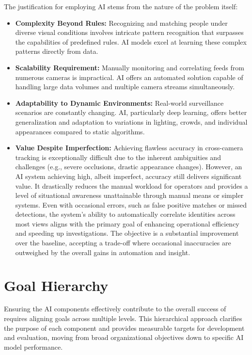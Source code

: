 The justification for employing AI stems from the nature of the problem itself:
\begin{itemize}
    \item \textbf{Complexity Beyond Rules:} Recognizing and matching people under diverse visual conditions involves intricate pattern recognition that surpasses the capabilities of predefined rules. AI models excel at learning these complex patterns directly from data.
    \item \textbf{Scalability Requirement:} Manually monitoring and correlating feeds from numerous cameras is impractical. AI offers an automated solution capable of handling large data volumes and multiple camera streams simultaneously.
    \item \textbf{Adaptability to Dynamic Environments:} Real-world surveillance scenarios are constantly changing. AI, particularly deep learning, offers better generalization and adaptation to variations in lighting, crowds, and individual appearances compared to static algorithms.
    \item \textbf{Value Despite Imperfection:} Achieving flawless accuracy in cross-camera tracking is exceptionally difficult due to the inherent ambiguities and challenges (e.g., severe occlusions, drastic appearance changes). However, an AI system achieving high, albeit imperfect, accuracy still delivers significant value. It drastically reduces the manual workload for operators and provides a level of situational awareness unattainable through manual means or simpler systems. Even with occasional errors, such as false positive matches or missed detections, the system's ability to automatically correlate identities across most views aligns with the primary goal of enhancing operational efficiency and speeding up investigations. The objective is a substantial improvement over the baseline, accepting a trade-off where occasional inaccuracies are outweighed by the overall gains in automation and insight.
\end{itemize}



\section{Goal Hierarchy}
\label{section:goal-hierarchy}

Ensuring the AI components effectively contribute to the overall success of \usevar{\srsTitle} requires aligning goals across multiple levels. This hierarchical approach clarifies the purpose of each component and provides measurable targets for development and evaluation, moving from broad organizational objectives down to specific AI model performance.

